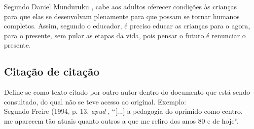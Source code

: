 Segundo Daniel Munduruku \cite{aruju}, cabe aos adultos oferecer condições às crianças para que elas se desenvolvam plenamente para que possam se tornar humanos completos. Assim, segundo o educador, é preciso educar as crianças para o agora, para o presente, sem pular as etapas da vida, pois pensar o futuro é renunciar o presente.

\subsection{Citação de citação}	

Define-se como texto citado por outro autor dentro do documento que está sendo consultado, do qual não se teve acesso ao original. Exemplo:
\\
Segundo Freire (1994, p. 13, \textit{apud} \cite[p.17]{streck}, “[...] a pedagogia do oprimido como centro, me aparecem tão atuais quanto outros a que me refiro dos anos 80 e de hoje”.


